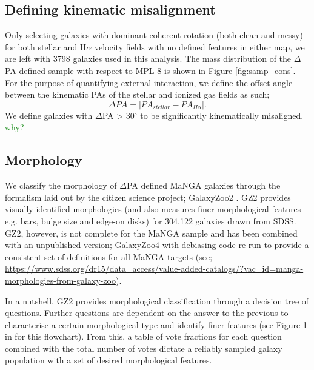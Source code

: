 \documentclass[fleqn,usenatbib]{mnras}
\newcommand{\green}[1]{{\textcolor{green}{#1}}}
\begin{document}
\subsection{Defining kinematic misalignment} \label{sec:def_kin_mis}
Only selecting galaxies with dominant coherent rotation (both clean and messy) for both stellar and H$\alpha$ velocity fields with no defined features in either map, we are left with 3798 galaxies used in this analysis. The mass distribution of the $\Delta$PA defined sample with respect to MPL-8 is shown in Figure \ref{fig:samp_cons}. For the purpose of quantifying external interaction, we define the offset angle between the kinematic PAs of the stellar and ionized gas fields as such; 
\begin{equation} \label{eq:delPA}
\Delta PA = |PA_{stellar} - PA_{H\alpha}|. 
\end{equation}
We define galaxies with $\Delta$PA > 30$^{\circ}$ to be significantly kinematically misaligned. \green{why?}

\subsection{Morphology}
We classify the morphology of $\Delta$PA defined MaNGA galaxies through the formalism laid out by the citizen science project; GalaxyZoo2 \citep[GZ2;][]{willett2013}. GZ2 provides visually identified morphologies (and also measures finer morphological features e.g. bars, bulge size and edge-on disks) for 304,122 galaxies drawn from SDSS. GZ2, however, is not complete for the MaNGA sample and has been combined with an unpublished version; GalaxyZoo4 with debiasing code re-run to provide a consistent set of definitions for all MaNGA targets (see; \url{https://www.sdss.org/dr15/data_access/value-added-catalogs/?vac_id=manga-morphologies-from-galaxy-zoo}). 

In a nutshell, GZ2 provides morphological classification through a decision tree of questions. Further questions are dependent on the answer to the previous to characterise a certain morphological type and identify finer features (see Figure 1 in \citep{willett2013} for this flowchart). From this, a table of vote fractions for each question combined with the total number of votes dictate a reliably sampled galaxy population with a set of desired morphological features. 
\end{document}
